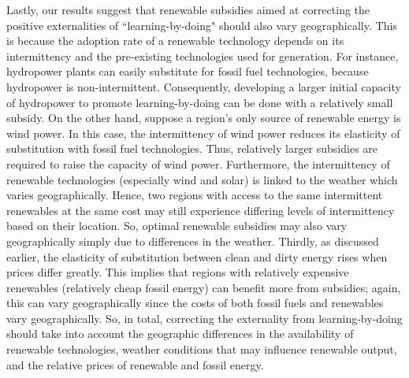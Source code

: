 \documentclass[11pt,a4paper]{extarticle}
\begin{document}
Lastly, our results suggest that renewable subsidies aimed at correcting the positive externalities of ``learning-by-doing" should also vary geographically. This is because the adoption rate of a renewable technology depends on its intermittency and the pre-existing technologies used for generation. For instance, hydropower plants can easily substitute for fossil fuel technologies, because hydropower is non-intermittent. Consequently, developing a larger initial capacity of hydropower to promote learning-by-doing can be done with a relatively small subsidy. On the other hand, suppose a region's only source of renewable energy is wind power. In this case, the intermittency of wind power reduces its elasticity of substitution with fossil fuel technologies. Thus, relatively larger subsidies are required to raise the capacity of wind power. Furthermore, the intermittency of renewable technologies (especially wind and solar) is linked to the weather which varies geographically. Hence, two regions with access to the same intermittent renewables at the same cost may still experience differing levels of intermittency based on their location. So, optimal renewable subsidies may also vary geographically simply due to differences in the weather. Thirdly, as discussed earlier, the elasticity of substitution between clean and dirty energy rises when prices differ greatly. This implies that regions with relatively expensive renewables (relatively cheap fossil energy) can benefit more from subsidies; again, this can vary geographically since the costs of both fossil fuels and renewables vary geographically. So, in total, correcting the externality from learning-by-doing should take into account the geographic differences in the availability of renewable technologies, weather conditions that may influence renewable output, and the relative prices of renewable and fossil energy. 
\end{document}
